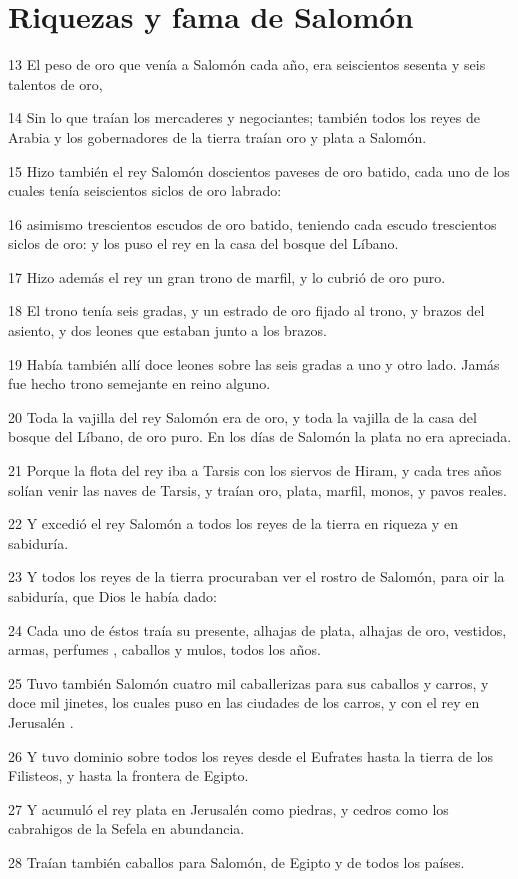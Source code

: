 \section*{Riquezas y fama de Salomón}

\par 13 El peso de oro que venía a Salomón cada año, era seiscientos sesenta y seis talentos de oro,
\par 14 Sin lo que traían los mercaderes y negociantes; también todos los reyes de Arabia y los gobernadores de la tierra traían oro y plata a Salomón.
\par 15 Hizo también el rey Salomón doscientos paveses de oro batido, cada uno de los cuales tenía seiscientos siclos de oro   labrado:
\par 16 asimismo trescientos escudos de oro batido, teniendo cada escudo trescientos siclos de oro:   y los puso el rey en la casa del bosque del Líbano.
\par 17 Hizo además el rey un gran trono de marfil, y lo cubrió de oro puro.
\par 18 El trono tenía seis gradas, y un estrado de oro fijado al trono, y brazos del asiento, y dos leones que estaban junto a los brazos.
\par 19 Había también allí doce leones sobre las seis gradas a uno y otro lado. Jamás fue hecho trono semejante en reino alguno.
\par 20 Toda la vajilla del rey Salomón era de oro, y toda la vajilla de la casa del bosque del Líbano, de oro puro. En los días de Salomón la plata no era apreciada.
\par 21 Porque la flota del rey iba a Tarsis con los siervos de Hiram, y cada tres años solían venir las naves de Tarsis, y traían oro, plata, marfil, monos, y pavos reales.
\par 22 Y excedió el rey Salomón a todos los reyes de la tierra en riqueza y en sabiduría.
\par 23 Y todos los reyes de la tierra procuraban ver el rostro de Salomón, para oir la sabiduría, que Dios le había dado:
\par 24 Cada uno de éstos traía su presente, alhajas de plata, alhajas de oro, vestidos, armas, perfumes , caballos y mulos, todos los años.
\par 25 Tuvo también Salomón cuatro mil caballerizas para sus caballos y carros, y doce mil jinetes, los cuales puso en las ciudades de los carros, y con el rey en Jerusalén .
\par 26 Y tuvo dominio sobre todos los reyes desde el Eufrates hasta la tierra de los Filisteos, y hasta la frontera de Egipto. 
\par 27 Y acumuló el rey plata en Jerusalén  como piedras, y cedros como los cabrahigos de la Sefela en abundancia.
\par 28 Traían también caballos para Salomón, de Egipto y de todos los países.


